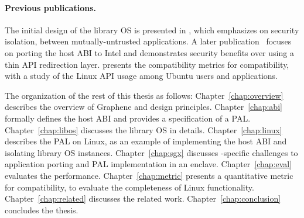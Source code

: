 \paragraph{Previous publications.}
The initial design of the \graphene{} library OS is presented in \cite{tsai14graphene}, which emphasizes on security isolation, between mutually-untrusted applications.
A later publication~\cite{tsai17graphene-sgx} focuses on porting the host ABI
to Intel \sgx{} and demonstrates security benefits 
over using a thin API redirection layer. %
\cite{tsai16apistudy} presents the compatibility metrics for compatibility,
with a study of the Linux API usage among Ubuntu users and applications.


The organization of the rest of this thesis as follows:
Chapter~\ref{chap:overview} describes the overview of Graphene %
and design principles.
Chapter~\ref{chap:abi} formally defines the host ABI and provides a specification of a PAL.
Chapter~\ref{chap:libos} discusses the library OS in details.
Chapter~\ref{chap:linux} describes the PAL on Linux, as an example of implementing the host ABI and isolating library OS instances.
Chapter~\ref{chap:sgx} discusses \sgx{}-specific challenges to application porting and PAL implementation in an enclave.
Chapter~\ref{chap:eval} evaluates the performance.
Chapter~\ref{chap:metric} presents a quantitative metric for compatibility,
to evaluate the completeness of Linux functionality.
Chapter~\ref{chap:related} discusses the related work.
Chapter~\ref{chap:conclusion} concludes the thesis.
